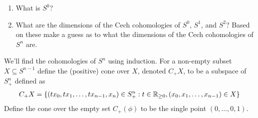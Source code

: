 \begin{ques} $ $
\begin{enumerate}
  \item What is $S^0$?
  \item What are the dimensions of the Cech cohomologies of $S^0$, $S^1$, and $S^2$? Based on these make a guess as to what the dimensions of the Cech cohomologies of $S^n$ are.
\end{enumerate}
\end{ques}
\noindent We'll find the cohomologies of $S^n$ using induction.
For a non-empty subset $X \subseteq S^{n-1}$ define the (positive) cone over $X$, denoted $C_+ X$, to be a subspace of $S^{n}_+$ defined as
\begin{align*}
  C_+ X = \{ (tx_0, tx_1, \dots, tx_{n-1}, x_n) \in S^{n}_+ : t \in \mathbb{R}_{\ge 0}, (x_0, x_1, \dots, x_{n-1}) \in X \}
\end{align*}
Define the cone over the empty set $C_+(\phi)$ to be the single point $(0,\dots,0,1)$.

